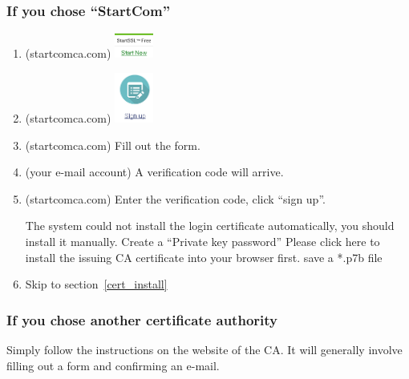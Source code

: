\begin{minipage}{\textwidth}
  \subsubsection{If you chose ``StartCom''}
  \begin{multicols}{2}
    \begin{enumerate}
    \item (startcomca.com) \includegraphics[width=0.1\textwidth]{images/startcomca_step1}
    \item (startcomca.com) \includegraphics[width=0.1\textwidth]{images/startcomca_step2_signup}
    \item (startcomca.com) Fill out the form.
    \item (your e-mail account) A verification code will arrive.
    \item (startcomca.com) Enter the verification code, click ``sign up''.
      
      The system could not install the login certificate
      automatically, you should install it manually.  Create a
      ``Private key password'' Please click here to install the
      issuing CA certificate into your browser first.  save a *.p7b
      file
      
    \item Skip to section~\ref{cert_install}
    \end{enumerate}
  \end{multicols}
\end{minipage}

\subsubsection{If you chose another certificate authority}
Simply follow the instructions on the website of the CA.  It will
generally involve filling out a form and confirming an e-mail.
